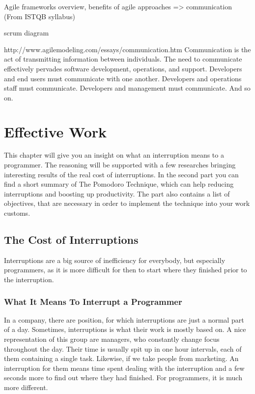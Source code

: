 \documentclass[11pt,singleside]{myfithesis2}
\begin{document}
Agile frameworks overview, benefits of agile approaches => communication (From ISTQB syllabus)

scrum diagram

http://www.agilemodeling.com/essays/communication.htm
Communication is the act of transmitting information between individuals. The need to communicate effectively pervades software development, operations, and support. Developers and end users must communicate with one another. Developers and operations staff must communicate. Developers and management must communicate. And so on.




\chapter{Effective Work}

This chapter will give you an insight on what an interruption means to a programmer. The reasoning will be supported with a few researches bringing interesting results of the real cost of interruptions. In the second part you can find a short summary of The Pomodoro Technique, which can help reducing interruptions and boosting up productivity. The part also contains a list of objectives, that are necessary in order to implement the technique into your work customs.

	\section{The Cost of Interruptions}
Interruptions are a big source of inefficiency for everybody, but especially programmers, as it is more difficult for then to start where they finished prior to the interruption.

		\subsection{What It Means To Interrupt a Programmer}
In a company, there are position, for which interruptions are just a normal part of a day. Sometimes, interruptions is what their work is mostly based on. A nice representation of this group are managers, who constantly change focus throughout the day. Their time is usually spit up in one hour intervals, each of them containing a single task. Likewise, if we take people from marketing. An interruption for them means time spent dealing with the interruption and a few seconds more to find out where they had finished. For programmers, it is much more different.
\end{document}
